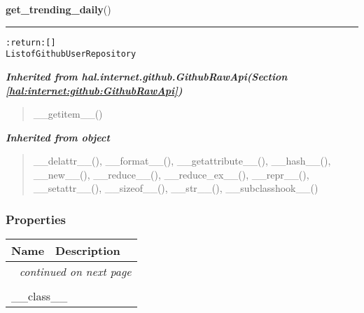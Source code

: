     \label{hal:internet:github:GithubApi:get_trending_daily}

    \vspace{0.5ex}

\hspace{.8\funcindent}\begin{boxedminipage}{\funcwidth}

    \raggedright \textbf{get\_trending\_daily}()

    \vspace{-1.5ex}

    \rule{\textwidth}{0.5\fboxrule}
\setlength{\parskip}{2ex}
\begin{alltt}

:return: []
    List of GithubUserRepository
\end{alltt}

\setlength{\parskip}{1ex}
    \end{boxedminipage}


\large{\textbf{\textit{Inherited from hal.internet.github.GithubRawApi\textit{(Section \ref{hal:internet:github:GithubRawApi})}}}}

\begin{quote}
\_\_getitem\_\_()
\end{quote}

\large{\textbf{\textit{Inherited from object}}}

\begin{quote}
\_\_delattr\_\_(), \_\_format\_\_(), \_\_getattribute\_\_(), \_\_hash\_\_(), \_\_new\_\_(), \_\_reduce\_\_(), \_\_reduce\_ex\_\_(), \_\_repr\_\_(), \_\_setattr\_\_(), \_\_sizeof\_\_(), \_\_str\_\_(), \_\_subclasshook\_\_()
\end{quote}


  \subsubsection{Properties}

    \vspace{-1cm}
\hspace{\varindent}\begin{longtable}{|p{\varnamewidth}|p{\vardescrwidth}|l}
\cline{1-2}
\cline{1-2} \centering \textbf{Name} & \centering \textbf{Description}& \\
\cline{1-2}
\endhead\cline{1-2}\multicolumn{3}{r}{\small\textit{continued on next page}}\\\endfoot\cline{1-2}
\endlastfoot\multicolumn{2}{|l|}{\textit{Inherited from object}}\\
\multicolumn{2}{|p{\varwidth}|}{\raggedright \_\_class\_\_}\\
\cline{1-2}
\end{longtable}


